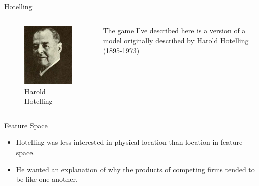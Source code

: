 \documentclass[
  14pt,
  letterpaper,
  ignorenonframetext,
  aspectratio=169,
]{beamer}
\providecommand{\tightlist}{%
  \setlength{\itemsep}{0pt}\setlength{\parskip}{0pt}}\usepackage{longtable,booktabs,array}
\let\olditem\item
\renewcommand{\item}{%
\olditem\vspace{6pt}}
\begin{document}
\begin{frame}{Hotelling}
\protect\hypertarget{hotelling}{}
\begin{columns}[c]
\begin{column}{0.48\textwidth}
\begin{figure}

{\centering \includegraphics{images/hotelling.jpg}

}

\caption{Harold Hotelling}

\end{figure}
\end{column}

\begin{column}{0.48\textwidth}
The game I've described here is a version of a model originally
described by Harold Hotelling (1895-1973)
\end{column}
\end{columns}
\end{frame}

\begin{frame}{Feature Space}
\protect\hypertarget{feature-space}{}
\begin{itemize}[<+->]
\tightlist
\item
  Hotelling was less interested in physical location than location in
  feature space.
\item
  He wanted an explanation of why the products of competing firms tended
  to be like one another.
\end{itemize}
\end{frame}
\end{document}
